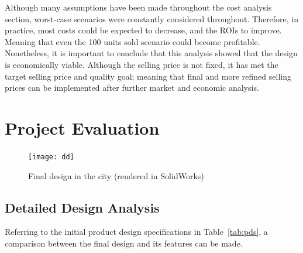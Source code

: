 \documentclass[a4paper,11pt]{article}
\begin{document}
Although many assumptions have been made throughout the cost analysis section, worst-case scenarios were constantly considered throughout. Therefore, in practice, most costs could be expected to decrease, and the ROIs to improve. Meaning that even the 100 units sold scenario could become profitable. Nonetheless, it is important to conclude that this analysis showed that the design is economically viable. Although the selling price is not fixed, it has met the target selling price and quality goal; meaning that final and more refined selling prices can be implemented after further market and economic analysis. 

\section{Project Evaluation}

\begin{figure}[ht]
	\centering
	\texttt{[image: dd]}
	\caption{Final design in the city (rendered in SolidWorks)}
\end{figure}

\subsection{Detailed Design Analysis}

Referring to the initial product design specifications in Table~\ref{tab:pds}, a comparison between the final design and its features can be made.
\end{document}
